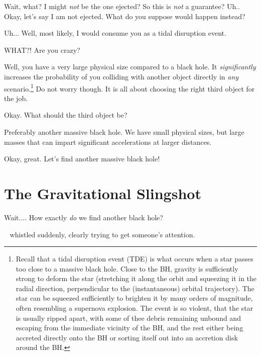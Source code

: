 \documentclass[main.tex]{subfiles}
\begin{document}
\par \Electra Wait, what?  I might \textit{not} be the one ejected?  So this is \textit{not} a guarantee?  Uh.. Okay, let's say I am not ejected.  What do you suppose would happen instead?

\par \Chiron Uh... Well, most likely, I would consume you as a tidal disruption event.

\par \Electra WHAT?!  Are you crazy? 

\par \Chiron Well, you have a very large physical size compared to a black hole.  It \textit{significantly} increases the probability of you colliding with another object directly in \textit{any} scenario.\footnote{Recall that a tidal disruption event (TDE) is what occurs when a star passes too close to a massive black hole.  Close to the BH, gravity is sufficiently strong to deform the star (stretching it along the orbit and squeezing it in the radial direction, perpendicular to the (instantaneous) orbital trajectory).  The star can be squeezed sufficiently to brighten it by many orders of magnitude, often resembling a supernova explosion.  The event is so violent, that the star is usually ripped apart, with some of thee debris remaining unbound and escaping from the immediate vicinity of the BH, and the rest either being accreted directly onto the BH or sorting itself out into an accretion disk around the BH.}  Do not worry though.  It is all about choosing the right third object for the job.  

\par \Electra Okay.  What should the third object be?

\par \Chiron Preferably another massive black hole.  We have small physical sizes, but large masses that can impart significant accelerations at larger distances.

\par \Electra Okay, great.  Let's find another massive black hole!

\section{The Gravitational Slingshot}

\par \Electra Wait.... How exactly \textit{do} we find another black hole?

\par \nar \rmchiron~ whistled suddenly, clearly trying to get someone's attention.
\end{document}
